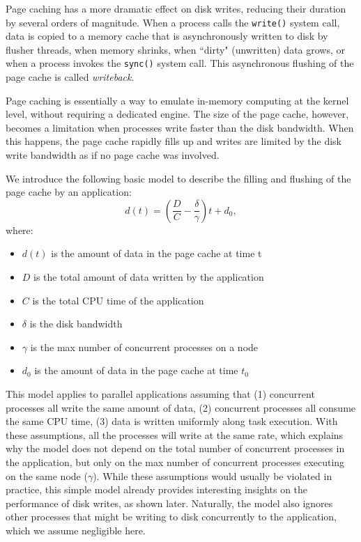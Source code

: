 Page caching has a more dramatic effect on disk writes, reducing their 
duration by several orders of magnitude. When a process calls the 
\texttt{write()} system call, data is copied to a memory cache that is 
asynchronously written to disk by flusher threads, when memory shrinks, when
``dirty" (unwritten) data grows, or when a 
process invokes the \texttt{sync()} system call. 
This asynchronous flushing of the page cache is called 
\emph{writeback}.

Page caching is essentially a way to 
emulate in-memory computing at the kernel level, without requiring a 
dedicated engine. The size of the page cache, however, becomes a 
limitation when processes write faster than the disk bandwidth. When 
this happens, the page cache rapidly fills up and writes are limited by 
the disk write bandwidth as if no page cache was involved.

We introduce the following basic model to describe the filling and 
flushing of the page cache by an application:
$$
d(t) = \left( \frac{D}{C} - \frac{\delta}{\gamma} \right)t + d_0,
$$
where:
\begin{itemize}
\item $d(t)$ is the amount of data in the page cache at time t
\item $D$ is the total amount of data written by the application
\item $C$ is the total CPU time of the application
\item $\delta$ is the disk bandwidth
\item $\gamma$ is the max number of concurrent processes on a node
\item $d_0$ is the amount of data in the page cache at time $t_0$
\end{itemize}

This model applies to parallel applications assuming that (1) 
concurrent processes all write the same amount of data, (2) 
concurrent processes all consume the same CPU time, (3) data is written 
uniformly along task execution. With these assumptions, all the 
processes will write at the same rate, which explains why the model 
does not depend on the total number of concurrent processes in the 
application, but only on the max number of concurrent processes 
executing on the same node ($\gamma$). While these 
assumptions would usually be violated in practice, this simple 
model already provides interesting insights on the performance of disk 
writes, as shown later. Naturally, the model also ignores other 
processes that might be writing to disk concurrently to the 
application, which we assume negligible here. 

